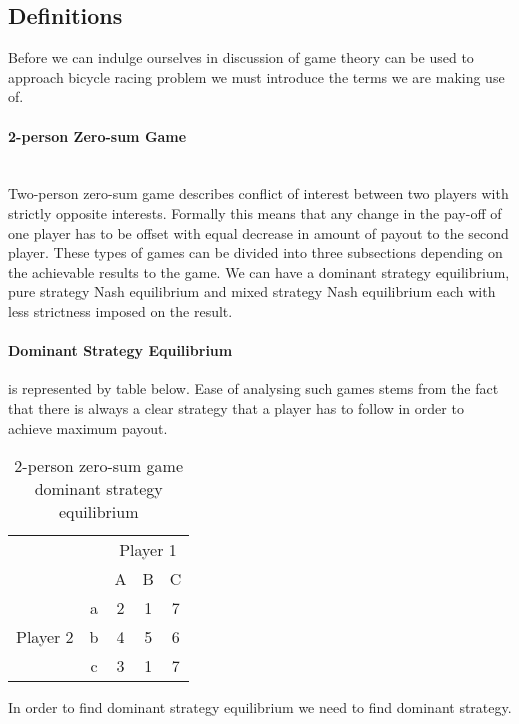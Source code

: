 \documentclass[10pt, a4paper]{report}
\begin{document}
\subsection{Definitions}\label{subsec:defs}

Before we can indulge ourselves in discussion of game theory can be used to approach bicycle racing problem we must introduce the terms we are making use of.

\paragraph{2-person Zero-sum Game} ~\\
Two-person zero-sum game describes conflict of interest between two players with strictly opposite interests. Formally this means that any change in the pay-off of one player has to be offset with equal decrease in amount of payout to the second player. These types of games can be divided into three subsections depending on the achievable results to the game. We can have a dominant strategy equilibrium, pure strategy Nash equilibrium and mixed strategy Nash equilibrium each with less strictness imposed on the result.
\paragraph{Dominant Strategy Equilibrium}
is represented by table below. Ease of analysing such games stems from the fact that there is always a clear strategy that a player has to follow in order to achieve maximum payout.\\


\begin{table}[ht!]
	\hspace{-4em}
	\centering
	\begin{tabular}{ccccc|}
		& & \multicolumn{3}{c}{Player 1}                                \\ \cline{3-5}
		& & A & B & \multicolumn{1}{c}{C}                               \\ \cline{3-5}
		\multirow{3}{*}{Player 2} & \multicolumn{1}{|c|}{a} & 2 & 1 & 7 \\
		& \multicolumn{1}{|c|}{b} & 4 & 5 & 6                           \\
		& \multicolumn{1}{|c|}{c} & 3 & 1 & 7                           \\ \cline{3-5}
	\end{tabular}
	\caption{2-person zero-sum game\\ dominant strategy equilibrium}
\end{table}
\noindent In order to find dominant strategy equilibrium we need to find dominant strategy.
\end{document}
